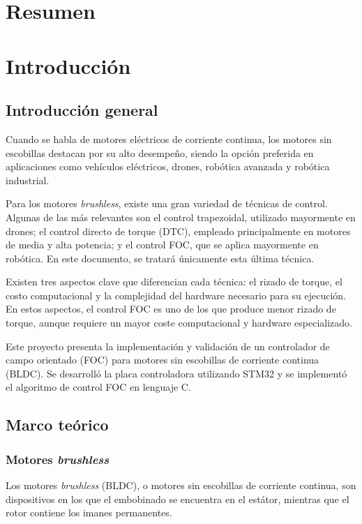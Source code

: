 \documentclass[11pt]{report}
\begin{document}
\normalsize
{}
\setcounter{page}{3}

\newpage
\tableofcontents



\newpage
\chapter*{Resumen}

\newpage
\chapter{Introducción}
\section{Introducción general}
Cuando se habla de motores eléctricos de corriente continua, los motores sin escobillas destacan por su alto desempeño, siendo la opción preferida en aplicaciones como vehículos eléctricos, drones, robótica avanzada y robótica industrial.

Para los motores \textit{brushless}, existe una gran variedad de técnicas de control. Algunas de las más relevantes son el control trapezoidal, utilizado mayormente en drones; el control directo de torque (DTC), empleado principalmente en motores de media y alta potencia; y el control FOC, que se aplica mayormente en robótica. En este documento, se tratará únicamente esta última técnica.

Existen tres aspectos clave que diferencian cada técnica: el rizado de torque, el costo computacional y la complejidad del hardware necesario para su ejecución. En estos aspectos, el control FOC es uno de los que produce menor rizado de torque, aunque requiere un mayor coste computacional y hardware especializado.

Este proyecto presenta la implementación y validación de un controlador de campo orientado (FOC) para motores sin escobillas de corriente continua (BLDC). Se desarrolló la placa controladora utilizando STM32 y se implementó el algoritmo de control FOC en lenguaje C.

\newpage
\section{Marco teórico}
\subsection{Motores \textit{brushless}}
Los motores \textit{brushless} (BLDC), o motores sin escobillas de corriente continua, son dispositivos en los que el embobinado se encuentra en el estátor, mientras que el rotor contiene los imanes permanentes.
\end{document}
